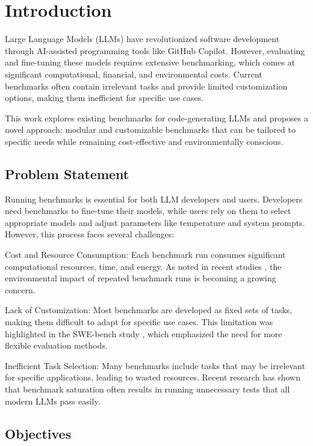 \chapter{Introduction}

Large Language Models (LLMs) have revolutionized software development through AI-assisted programming tools like GitHub Copilot. However, evaluating and fine-tuning these models requires extensive benchmarking, which comes at significant computational, financial, and environmental costs. Current benchmarks often contain irrelevant tasks and provide limited customization options, making them inefficient for specific use cases.

This work explores existing benchmarks for code-generating LLMs and proposes a novel approach: modular and customizable benchmarks that can be tailored to specific needs while remaining cost-effective and environmentally conscious.

\section{Problem Statement}

Running benchmarks is essential for both LLM developers and users. Developers need benchmarks to fine-tune their models, while users rely on them to select appropriate models and adjust parameters like temperature and system prompts. However, this process faces several challenges:

Cost and Resource Consumption: Each benchmark run consumes significant computational resources, time, and energy. As noted in recent studies \cite{Cantu-Paz98asurvey}, the environmental impact of repeated benchmark runs is becoming a growing concern.

Lack of Customization: Most benchmarks are developed as fixed sets of tasks, making them difficult to adapt for specific use cases. This limitation was highlighted in the SWE-bench study \cite{swebench2023}, which emphasized the need for more flexible evaluation methods.

Inefficient Task Selection: Many benchmarks include tasks that may be irrelevant for specific applications, leading to wasted resources. Recent research \cite{platinumbenchmarks2025} has shown that benchmark saturation often results in running unnecessary tests that all modern LLMs pass easily.

\section{Objectives}

